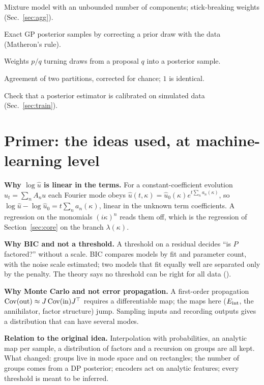 \begin{description}[leftmargin=4.2cm,labelwidth=4.0cm,itemsep=3pt]
\item[Dirichlet-process mixture] Mixture model with an unbounded number of components; stick-breaking weights (Sec.~\ref{sec:agg}).
\item[Pathwise conditioning] Exact GP posterior samples by correcting a prior draw with the data (Matheron's rule).
\item[Importance reweighting] Weights $p/q$ turning draws from a proposal $q$ into a posterior sample.
\item[Adjusted Rand Index] Agreement of two partitions, corrected for chance; $1$ is identical.
\item[Simulation-based calibration] Check that a posterior estimator is calibrated on simulated data (Sec.~\ref{sec:train}).
\end{description}

\section{Primer: the ideas used, at machine-learning level}\label{app:primer}
\textbf{Why $\log\hat u$ is linear in the terms.} For a constant-coefficient evolution $u_t=\sum_nA_nu$ each Fourier mode obeys $\hat u(t,\kappa)=\hat u_0(\kappa)e^{t\sum_na_n(\kappa)}$, so $\log\hat u-\log\hat u_0=t\sum_na_n(\kappa)$, linear in the unknown term coefficients. A regression on the monomials $(i\kappa)^n$ reads them off, which is the regression of Section~\ref{sec:core} on the branch $\lambda(\kappa)$.

\medskip\textbf{Why BIC and not a threshold.} A threshold on a residual decides ``is $P$ factored?'' without a scale. BIC compares models by fit and parameter count, with the noise scale estimated; two models that fit equally well are separated only by the penalty. The theory says no threshold can be right for all data ().

\medskip\textbf{Why Monte Carlo and not error propagation.} A first-order propagation $\operatorname{Cov}(\text{out})\approx J\operatorname{Cov}(\text{in})J^{\top}$ requires a differentiable map; the maps here ($E_{\mathrm{int}}$, the annihilator, factor structure) jump. Sampling inputs and recording outputs gives a distribution that can have several modes.

\medskip\textbf{Relation to the original idea.} Interpolation with probabilities, an analytic map per sample, a distribution of factors and a recursion on groups are all kept. What changed: groups live in mode space and on rectangles; the number of groups comes from a DP posterior; encoders act on analytic features; every threshold is meant to be inferred.


